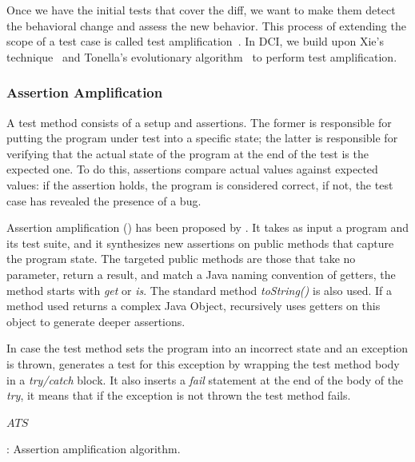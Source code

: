 Once we have the initial tests that cover the diff, we want to make them detect the behavioral change and assess the new behavior.
This process of extending the scope of a test case is called test amplification~\cite{zhang2012}.
In DCI, we build upon Xie's technique~\cite{TaoXie2006} and Tonella's evolutionary algorithm~\cite{tonella} to perform test amplification.

\subsubsection{Assertion Amplification}
\label{subsec:aampl}

A test method consists of a setup and assertions.
The former is responsible for putting the program under test into a specific state; the latter is responsible for verifying that the actual state of the program at the end of the test is the expected one.
To do this, assertions compare actual values against expected values: if the assertion holds, the program is considered correct, if not, the test case has revealed the presence of a bug.

Assertion amplification (\aampl) has been proposed by \cite{TaoXie2006}.
It takes as input a program and its test suite, and it synthesizes new assertions on public methods that capture the program state.
The targeted public methods are those that take no parameter, return a result, and match a Java naming convention of getters, \eg the method starts with \emph{get} or \emph{is}. The standard method \emph{toString()} is also used.
If a method used returns a complex Java Object, \aampl recursively uses getters on this object to generate deeper assertions.

In case the test method sets the program into an incorrect state and an exception is thrown, \aampl generates a test for this exception by wrapping the test method body in a \emph{try/catch} block. 
It also inserts a \emph{fail} statement at the end of the body of the \emph{try}, \ie it means that if the exception is not thrown the test method fails.

\begin{algorithm}[h]
\begin{algorithmic}[1]
    \EndFor
\EndFor
\Return $ATS$
\end{algorithmic}
\caption{\aampl: Assertion amplification algorithm.}
\label{algo:aampl}
\end{algorithm}

